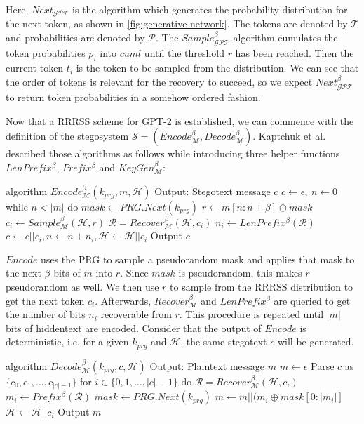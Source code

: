 Here, $Next_{\mathcal{GPT}}$ is the algorithm which generates the probability distribution for the next token, as shown in \autoref{fig:generative-network}.
The tokens are denoted by $\mathcal{T}$ and probabilities are denoted by $\mathcal{P}$.
The $Sample_{\mathcal{GPT}}^\beta$ algorithm cumulates the token probabilities $p_i$ into $cuml$ until the threshold $r$ has been reached.
Then the current token $t_i$ is the token to be sampled from the distribution.
We can see that the order of tokens is relevant for the recovery to succeed, so we expect $Next_{\mathcal{GPT}}^\beta$ to return token probabilities in a somehow ordered fashion.

Now that a RRRSS scheme for GPT-2 is established, we can commence with the definition of the stegosystem $\mathcal{S} = \left( Encode_{\mathcal{M}}^\beta, Decode_{\mathcal{M}}^\beta \right)$.
Kaptchuk et al. described those algorithms as follows while introducing three helper functions $LenPrefix^\beta$, $Prefix^\beta$ and $KeyGen_{\mathcal{M}}^\beta$:


\begin{Pseudocode}[float, caption={Meteor Encode Algorithm}, label={alg:encode}]
algorithm $Encode_{\mathcal{M}}^\beta(k_{prg}, m, \mathcal{H})$
	Output: Stegotext message $c$
	$c \leftarrow \epsilon,~ n \leftarrow 0$
	while $n < |m|$ do
		$mask \leftarrow PRG.Next(k_{prg})$
		$r \leftarrow m[n:n+\beta] \oplus mask$
		$c_i \leftarrow Sample_{\mathcal{M}}^\beta(\mathcal{H}, r)$
		$\mathcal{R} = Recover_{\mathcal{M}}^\beta(\mathcal{H}, c_i)$
		$n_i \leftarrow LenPrefix^\beta(\mathcal{R})$
		$c \leftarrow c || c_i, n \leftarrow n+n_i, \mathcal{H} \leftarrow \mathcal{H}||c_i$
	Output $c$
\end{Pseudocode}

$Encode$ uses the PRG to sample a pseudorandom mask and applies that mask to the next $\beta$ bits of $m$ into $r$.
Since $mask$ is pseudorandom, this makes $r$ pseudorandom as well.
We then use $r$ to sample from the RRRSS distribution to get the next token $c_i$.
Afterwards, $Recover_{\mathcal{M}}^\beta$ and $LenPrefix^\beta$ are queried to get the number of bits $n_i$ recoverable from $r$.
This procedure is repeated until $|m|$ bits of hiddentext are encoded.
Consider that the output of $Encode$ is deterministic, i.e. for a given $k_{prg}$ and $\mathcal{H}$, the same stegotext $c$ will be generated.


\begin{Pseudocode}[float, caption={Meteor Decode Algorithm}, label={alg:decode}]
algorithm $Decode_{\mathcal{M}}^\beta(k_{prg}, c, \mathcal{H})$
	Output: Plaintext message $m$
	$m \leftarrow \epsilon$
	Parse $c$ as $\{ c_0, c_1, \dots, c_{|c|-1} \}$
	for $i \in \{0, 1, \dots, |c|-1 \}$ do
		$\mathcal{R} = Recover_{\mathcal{M}}^\beta(\mathcal{H}, c_i)$
		$m_i \leftarrow Prefix^\beta(\mathcal{R})$
		$mask \leftarrow PRG.Next(k_{prg})$
		$m \leftarrow m || (m_i \oplus mask[0: |m_i|]$
		$\mathcal{H} \leftarrow \mathcal{H}||c_i$
	Output $m$
\end{Pseudocode}

